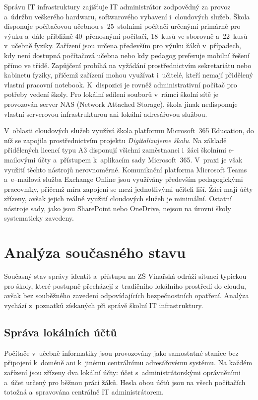 \documentclass[male,czech,api_bc]{kitheses}
\begin{document}
Správu IT infrastruktury zajišťuje IT administrátor zodpovědný za provoz 
a~údržbu veškerého hardwaru, softwarového vybavení i~cloudových služeb. 
Škola disponuje počítačovou učebnou s~25~stolními počítači určenými primárně 
pro výuku a~dále přibližně 40~přenosnými počítači, 18~kusů ve sborovně a~22~kusů v~učebně fyziky. 
Zařízení jsou určena především pro výuku žáků v~případech, kdy není dostupná počítačová učebna nebo kdy pedagog preferuje mobilní řešení přímo ve třídě. 
Zapůjčení probíhá na vyžádání prostřednictvím sekretariátu nebo kabinetu fyziky, přičemž zařízení mohou využívat i~učitelé, kteří nemají přidělený vlastní pracovní notebook. 
K~dispozici je rovněž administrativní počítač pro potřeby 
vedení školy. Pro lokální sdílení souborů v~rámci školní sítě je provozován 
server NAS (Network Attached Storage), škola jinak nedisponuje vlastní 
serverovou infrastrukturou ani lokální adresářovou službou.

V~oblasti cloudových služeb využívá škola platformu Microsoft~365 Education, 
do níž se zapojila prostřednictvím projektu \textit{Digitalizujeme školu}. Na základě 
přidělených licencí typu A3 disponují všichni zaměstnanci i~žáci školními 
\mbox{e-mailovými} účty a~přístupem k~aplikacím sady Microsoft~365. V~praxi je však 
využití těchto nástrojů nerovnoměrné. Komunikační platforma Microsoft Teams 
a~\mbox{e--mailová} služba Exchange Online jsou využívány především pedagogickými 
pracovníky, přičemž míra zapojení se mezi jednotlivými učiteli liší. Žáci 
mají účty zřízeny, avšak jejich reálné využití cloudových služeb je minimální. 
Ostatní nástroje sady, jako jsou SharePoint nebo OneDrive, nejsou na úrovni 
školy systematicky zavedeny.

\section{Analýza současného stavu}

Současný stav správy identit a~přístupu na ZŠ Vinařská odráží situaci typickou 
pro školy, které postupně přecházejí z~tradičního lokálního prostředí do cloudu, 
avšak bez souběžného zavedení odpovídajících bezpečnostních opatření. Analýza 
vychází z~poznatků získaných při správě školní IT infrastruktury.

\subsection{Správa lokálních účtů}

Počítače v~učebně informatiky jsou provozovány jako samostatné stanice bez 
připojení k~doméně ani k~jinému centrálnímu adresářovému systému. Na každém 
zařízení jsou zřízeny dva lokální účty: účet s~administrátorskými oprávněními 
a~účet určený pro běžnou práci žáků. Hesla obou účtů jsou na všech počítačích 
totožná a~spravována centrálně IT administrátorem.
\end{document}
